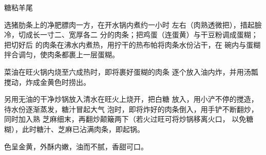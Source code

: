 \begin{recipe}{糖粘羊尾}

\ingredients



\cooking

\step 选猪肋条上的净肥膘肉一方，在开水锅内煮约一小时 左右（肉熟透微把），措起臉冷，切成长一寸二、宽厚各二 分的肉条；把鸡蛋（连蛋黄）与干豆粉调成蛋糊；把切好后 的肉条在沸水内煮热，用拧干的热布帕将肉条水份沾干，在 碗内与蛋糊拌合调匀，使肉条都裹上一层蛋糊。

\step 菜油在旺火锅内烧至六成热时，即将裹好蛋糊的肉条 逐个放入油内炸，并用汤瓢搅动，炸成金黄色时捞出。

\step 另用无油的干净炒锅放入清水在旺火上烧开，把白糖 放入，用小浐不停的搅造，待水份逐渐蒸发，糖汁冒起大气 泡时，即将炸好的肉条倒入，用手铲不断翻炒，同时加入熟 芝麻细末，再翻炒颠簸两下（若火过旺可将炒锅移离火口， 以免糖糊），此时糖汁、芝麻已沾满肉条，即起锅。

\notes

色呈金黄，外酥内嫩，油而不腻，香甜可口。

\end{recipe}


